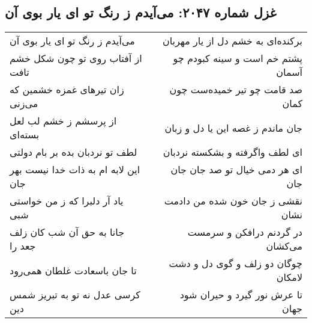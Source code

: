 \begin{center}
\section*{غزل شماره ۲۰۴۷: می‌آیدم ز رنگ تو ای یار بوی آن}
\label{sec:2047}
\begin{longtable}{l p{0.5cm} r}
می‌آیدم ز رنگ تو ای یار بوی آن
&&
برکنده‌ای به خشم دل از یار مهربان
\\
از آفتاب روی تو چون شکل خشم تافت
&&
پشتم خم است و سینه کبودم چو آسمان
\\
زان تیرهای غمزه خشمین که می‌زنی
&&
صد قامت چو تیر خمیده‌ست چون کمان
\\
از پرسشم ز خشم لب لعل بسته‌ای
&&
جان ماندم ز غصه این یا دل و زبان
\\
لطف تو نردبان بده بر بام دولتی
&&
ای لطف واگرفته و بشکسته نردبان
\\
این لابه ام به ذات خدا نیست بهر جان
&&
ای هر دمی خیال تو صد جان جان جان
\\
یاد آر دلبرا که ز من خواستی شبی
&&
نقشی ز جان خون شده من دادمت نشان
\\
جانا به حق آن شب کان زلف جعد را
&&
در گردنم درافکن و سرمست می‌کشان
\\
تا جان باسعادت غلطان همی‌رود
&&
چوگان دو زلف و گوی دل و دشت لامکان
\\
کرسی عدل نه تو به تبریز شمس دین
&&
تا عرش نور گیرد و حیران شود جهان
\\
\end{longtable}
\end{center}
